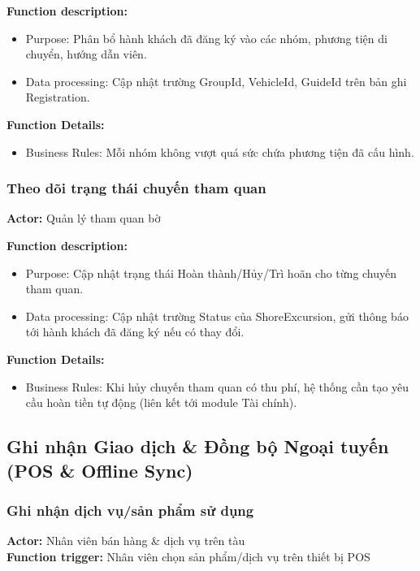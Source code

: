 \textbf{Function description:}
\begin{itemize}
    \item Purpose: Phân bổ hành khách đã đăng ký vào các nhóm, phương
    tiện di chuyển, hướng dẫn viên.
    \item Data processing: Cập nhật trường GroupId, VehicleId, GuideId
    trên bản ghi Registration.
\end{itemize}

\textbf{Function Details:}
\begin{itemize}
    \item Business Rules: Mỗi nhóm không vượt quá sức chứa phương tiện đã
    cấu hình.
\end{itemize}


\subsubsection{Theo dõi trạng thái chuyến tham quan}
\textbf{Actor:} Quản lý tham quan bờ

\textbf{Function description:}
\begin{itemize}
    \item Purpose: Cập nhật trạng thái Hoàn thành/Hủy/Trì hoãn cho từng
    chuyến tham quan.
    \item Data processing: Cập nhật trường Status của ShoreExcursion,
    gửi thông báo tới hành khách đã đăng ký nếu có thay đổi.
\end{itemize}

\textbf{Function Details:}
\begin{itemize}
    \item Business Rules: Khi hủy chuyến tham quan có thu phí, hệ thống
    cần tạo yêu cầu hoàn tiền tự động (liên kết tới module Tài chính).
\end{itemize}



\subsection{Ghi nhận Giao dịch \& Đồng bộ Ngoại tuyến (POS \& Offline
Sync)}

\subsubsection{Ghi nhận dịch vụ/sản phẩm sử dụng}
\textbf{Actor:} Nhân viên bán hàng \& dịch vụ trên tàu \\
\textbf{Function trigger:} Nhân viên chọn sản phẩm/dịch vụ trên thiết bị
POS

